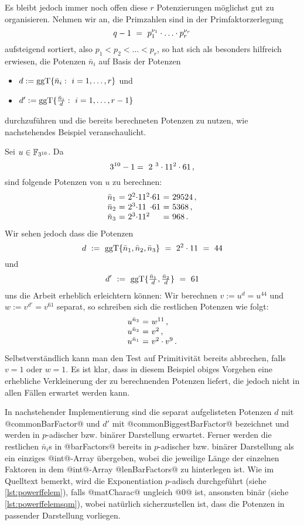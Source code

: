 Es bleibt jedoch immer noch offen diese $r$ Potenzierungen möglichst gut
zu organisieren. Nehmen wir an, die Primzahlen sind in der Primfaktorzerlegung
\[ q-1 \ =\  p_1^{\nu_1}\cdot\ldots\cdot p_r^{\nu_r}\]
aufsteigend sortiert, also $p_1<p_2<\ldots < p_r$, so
hat sich als besonders hilfreich erwiesen, die Potenzen $\bar n_i$ auf
Basis der Potenzen
\begin{itemize}
  \item $d := \ggT\{ \bar n_i:\ i=1,\ldots,r\}$ und 
  \item $d' := \ggT\{ \frac{\bar n_i}{d}:\ i=1,\ldots,r-1\}$
\end{itemize}
durchzuführen und die bereits berechneten Potenzen zu nutzen, 
wie nachstehendes Beispiel veranschaulicht.

\begin{beispiel}
  Sei $u \in \mathbb{F}_{3^{10}}$. Da
  \[ 3^{10}-1 = \ 2\ ^{3} \cdot 11^{2} \cdot 61 \,,\]
  sind folgende Potenzen von $u$ zu berechnen:
  \[ \begin{array}{l@{\ =\ }l@{}l@{}l@{\ =\ }l}
    \bar n_1 & 2^2 \cdot & 11^2 & \cdot 61 & 29524\,,\\
    \bar n_2 & 2^3 \cdot & 11 & \cdot 61 & 5368\,,\\
    \bar n_3 & 2^3 \cdot & 11^2 && 968\,. \end{array} \]
  Wir sehen jedoch dass die Potenzen
  \[ d \ :=\  \operatorname{ggT}\{ \bar n_1,\bar n_2,\bar n_3\} 
    \ =\  2^2\cdot 11 \ =\  44 \]
  und 
  \[ d' \ :=\  \operatorname{ggT}\{ \tfrac{\bar n_1}{d},\tfrac{\bar n_2}{d}\} \ =\  61\]
  uns die Arbeit erheblich erleichtern können:
  Wir berechnen $v := u^d = u^{44}$ und 
  $w := v^{d'} = v^{61}$ separat, so schreiben sich die restlichen Potenzen wie
  folgt:
  \[ \begin{array}{l@{\ =\ }l}
    u^{\bar n_3} & w^{11}\,, \\
    u^{\bar n_2} & v^2\,, \\
    u^{\bar n_1} & v^2 \cdot v^{9}\,.
  \end{array} \]
  Selbstverständlich kann man den Test auf Primitivität bereits abbrechen,
  falls $v = 1$ oder $w = 1$.
  Es ist klar, dass in diesem Beispiel obiges Vorgehen eine erhebliche
  Verkleinerung der zu berechnenden Potenzen liefert, die jedoch nicht in allen
  Fällen erwartet werden kann.
\end{beispiel}


In nachstehender Implementierung sind die separat aufgelisteten Potenzen $d$
mit @commonBarFactor@ und $d'$ mit @commonBiggestBarFactor@ bezeichnet und
werden in $p$-adischer bzw. binärer Darstellung erwartet.  Ferner
werden die restlichen $\bar n_i$s in @barFactors@ bereits in 
$p$-adischer bzw. binärer Darstellung als ein einziges @int@-Array übergeben, 
wobei die jeweilige Länge der einzelnen Faktoren in dem @int@-Array
@lenBarFactors@ zu hinterlegen ist. Wie im Quelltext bemerkt, wird 
die Exponentiation $p$-adisch durchgeführt (siehe \autoref{lst:powerffelem}),
falls @matCharac@ ungleich @0@ ist, ansonsten binär 
(siehe \autoref{lst:powerffelemsqm}), wobei natürlich sicherzustellen ist, dass
die Potenzen in passender Darstellung vorliegen.

